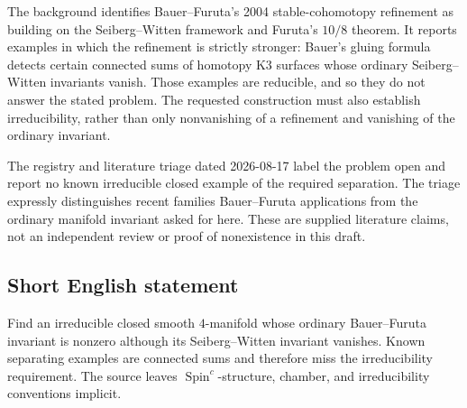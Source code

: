 \documentclass[11pt]{article}
\begin{document}
The background identifies Bauer--Furuta's 2004 stable-cohomotopy refinement as building on the Seiberg--Witten framework and Furuta's $10/8$ theorem. It reports examples in which the refinement is strictly stronger: Bauer's gluing formula detects certain connected sums of homotopy K3 surfaces whose ordinary Seiberg--Witten invariants vanish. Those examples are reducible, and so they do not answer the stated problem. The requested construction must also establish irreducibility, rather than only nonvanishing of a refinement and vanishing of the ordinary invariant.

The registry and literature triage dated 2026-08-17 label the problem open and report no known irreducible closed example of the required separation. The triage expressly distinguishes recent families Bauer--Furuta applications from the ordinary manifold invariant asked for here. These are supplied literature claims, not an independent review or proof of nonexistence in this draft.
\subsection{Short English statement}
Find an irreducible closed smooth $4$-manifold whose ordinary Bauer--Furuta invariant is nonzero although its Seiberg--Witten invariant vanishes. Known separating examples are connected sums and therefore miss the irreducibility requirement. The source leaves $\operatorname{Spin}^c$-structure, chamber, and irreducibility conventions implicit.
\end{document}
